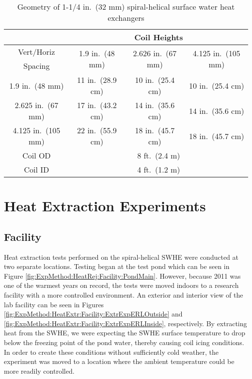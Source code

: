 	\begin{table}
	\centering
		\caption[1-1/4 in.\ (32 mm) spiral-helical SWHE geometry]{Geometry of 1-1/4 in.\ (32 mm) spiral-helical surface water heat exchangers}
		\label{tab:ExpMethod:HeatRej:Method:SWHEGeometry3}
		\begin{tabular}{|c|c|c|c|}
		\hline
		& \multicolumn{3}{|c|}{Coil Heights}\\
		\hline\hline
		Vert/Horiz & \multirow{2}{*}{1.9 in.\ (48 mm)} & \multirow{2}{*}{2.626 in.\ (67 mm)} & \multirow{2}{*}{4.125 in.\ (105 mm)} \\
		Spacing &  &  &  \\
		\hline
		1.9 in.\ (48 mm) & 11 in.\ (28.9 cm) & 10 in.\ (25.4 cm) & 10 in.\ (25.4 cm) \\
		\hline
		2.625 in.\ (67 mm) & 17 in.\ (43.2 cm) & 14 in.\ (35.6 cm) & 14 in.\ (35.6 cm) \\
		\hline
		4.125 in.\ (105 mm) & 22 in.\ (55.9 cm) & 18 in.\ (45.7 cm) & 18 in.\ (45.7 cm) \\
		\hline\hline
		Coil OD & \multicolumn{3}{|c|}{8 ft.\ (2.4 m)}\\
		\hline
		Coil ID & \multicolumn{3}{|c|}{4 ft.\ (1.2 m)}\\
		\hline
		\end{tabular}
	\end{table}

\section{Heat Extraction Experiments}
\label{sec:ExpMethod:HeatExtr}

	\subsection{Facility}
	\label{subsec:ExpMethod:HeatExtr:Facility}

Heat extraction tests performed on the spiral-helical SWHE were conducted at two separate locations. Testing began at the test pond which can be seen in Figure \ref{fig:ExpMethod:HeatRej:Facility:PondMain}. However, because 2011 was one of the warmest years on record, the tests were moved indoors to a research facility with a more controlled environment. An exterior and interior view of the lab facility can be seen in Figures \ref{fig:ExpMethod:HeatExtr:Facility:ExtrExpERLOutside} and \ref{fig:ExpMethod:HeatExtr:Facility:ExtrExpERLInside}, respectively. By extracting heat from the SWHE, we were expecting the SWHE surface temperature to drop below the freezing point of the pond water, thereby causing coil icing conditions. In order to create these conditions without sufficiently cold weather, the experiment was moved to a location where the ambient temperature could be more readily controlled.

